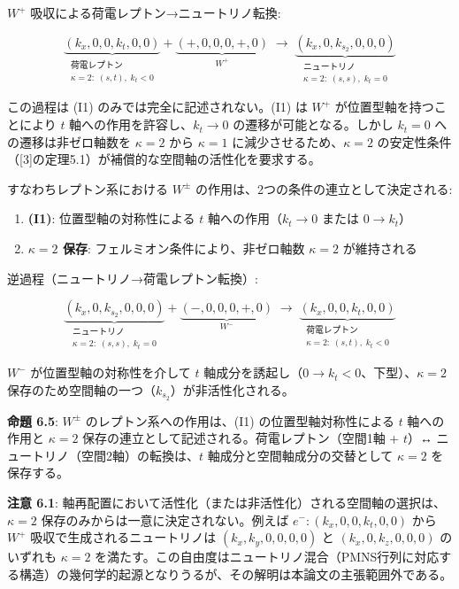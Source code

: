 \documentclass[
  a4paper,11pt]{ltjsarticle}
\providecommand{\tightlist}{%
  \setlength{\itemsep}{0pt}\setlength{\parskip}{0pt}}
\theoremstyle{definition}
\theoremstyle{remark}
\begin{document}
\(W^+\) 吸収による荷電レプトン→ニュートリノ転換:

\[\underbrace{(k_x, 0, 0, k_t, 0, 0)}_{\substack{\text{荷電レプトン} \\ \kappa = 2:\; (s, t),\; k_t < 0}} + \underbrace{(+, 0, 0, 0, +, 0)}_{W^+} \;\longrightarrow\; \underbrace{(k_x, 0, k_{s_2}, 0, 0, 0)}_{\substack{\text{ニュートリノ} \\ \kappa = 2:\; (s, s),\; k_t = 0}}\]

この過程は (I1) のみでは完全に記述されない。(I1) は \(W^+\)
が位置型軸を持つことにより \(t\) 軸への作用を許容し、\(k_t \to 0\)
の遷移が可能となる。しかし \(k_t = 0\) への遷移は非ゼロ軸数を
\(\kappa = 2\) から \(\kappa = 1\) に減少させるため、\(\kappa = 2\)
の安定性条件（{[}3{]}の定理5.1）が補償的な空間軸の活性化を要求する。

すなわちレプトン系における \(W^{\pm}\)
の作用は、2つの条件の連立として決定される:

\begin{enumerate}
\def\labelenumi{\arabic{enumi}.}
\tightlist
\item
  \textbf{(I1)}: 位置型軸の対称性による \(t\) 軸への作用（\(k_t \to 0\)
  または \(0 \to k_t\)）
\item
  \textbf{\(\kappa = 2\) 保存}: フェルミオン条件により、非ゼロ軸数
  \(\kappa = 2\) が維持される
\end{enumerate}

逆過程（ニュートリノ→荷電レプトン転換）:

\[\underbrace{(k_x, 0, k_{s_2}, 0, 0, 0)}_{\substack{\text{ニュートリノ} \\ \kappa = 2:\; (s, s),\; k_t = 0}} + \underbrace{(-, 0, 0, 0, +, 0)}_{W^-} \;\longrightarrow\; \underbrace{(k_x, 0, 0, k_t, 0, 0)}_{\substack{\text{荷電レプトン} \\ \kappa = 2:\; (s, t),\; k_t < 0}}\]

\(W^-\) が位置型軸の対称性を介して \(t\)
軸成分を誘起し（\(0 \to k_t < 0\)、下型）、\(\kappa = 2\)
保存のため空間軸の一つ（\(k_{s_2}\)）が非活性化される。

\textbf{命題 6.5}: \(W^{\pm}\) のレプトン系への作用は、(I1)
の位置型軸対称性による \(t\) 軸への作用と \(\kappa = 2\)
保存の連立として記述される。荷電レプトン（空間1軸 + \(t\)）↔
ニュートリノ（空間2軸）の転換は、\(t\) 軸成分と空間軸成分の交替として
\(\kappa = 2\) を保存する。

\textbf{注意 6.1}:
軸再配置において活性化（または非活性化）される空間軸の選択は、\(\kappa = 2\)
保存のみからは一意に決定されない。例えば \(e^-: (k_x, 0, 0, k_t, 0, 0)\)
から \(W^+\) 吸収で生成されるニュートリノは \((k_x, k_y, 0, 0, 0, 0)\)
と \((k_x, 0, k_z, 0, 0, 0)\) のいずれも \(\kappa = 2\)
を満たす。この自由度はニュートリノ混合（PMNS行列に対応する構造）の幾何学的起源となりうるが、その解明は本論文の主張範囲外である。
\end{document}
